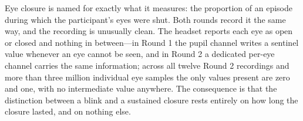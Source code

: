
Eye closure is named for exactly what it measures: the proportion of an episode during which
the participant's eyes were shut. Both rounds record it the same way, and the recording is
unusually clean. The headset reports each eye as open or closed and nothing in between---in
Round 1 the pupil channel writes a sentinel value whenever an eye cannot be seen, and in Round 2
a dedicated per-eye channel carries the same information; across all twelve Round 2 recordings
and more than three million individual eye samples the only values present are zero and one,
with no intermediate value anywhere. The consequence is that the distinction between a blink and
a sustained closure rests entirely on how long the closure lasted, and on nothing else.


